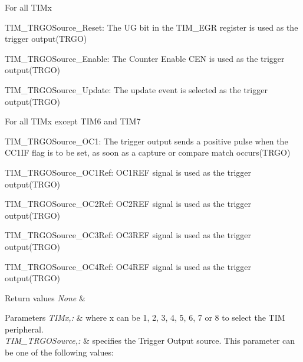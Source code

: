 \begin{DoxyItemize}
\item For all T\-I\-Mx \begin{DoxyItemize}
\item T\-I\-M\-\_\-\-T\-R\-G\-O\-Source\-\_\-\-Reset\-: The U\-G bit in the T\-I\-M\-\_\-\-E\-G\-R register is used as the trigger output(\-T\-R\-G\-O) \item T\-I\-M\-\_\-\-T\-R\-G\-O\-Source\-\_\-\-Enable\-: The Counter Enable C\-E\-N is used as the trigger output(\-T\-R\-G\-O) \item T\-I\-M\-\_\-\-T\-R\-G\-O\-Source\-\_\-\-Update\-: The update event is selected as the trigger output(\-T\-R\-G\-O)\end{DoxyItemize}

\item For all T\-I\-Mx except T\-I\-M6 and T\-I\-M7 \begin{DoxyItemize}
\item T\-I\-M\-\_\-\-T\-R\-G\-O\-Source\-\_\-\-O\-C1\-: The trigger output sends a positive pulse when the C\-C1\-I\-F flag is to be set, as soon as a capture or compare match occurs(\-T\-R\-G\-O) \item T\-I\-M\-\_\-\-T\-R\-G\-O\-Source\-\_\-\-O\-C1\-Ref\-: O\-C1\-R\-E\-F signal is used as the trigger output(\-T\-R\-G\-O) \item T\-I\-M\-\_\-\-T\-R\-G\-O\-Source\-\_\-\-O\-C2\-Ref\-: O\-C2\-R\-E\-F signal is used as the trigger output(\-T\-R\-G\-O) \item T\-I\-M\-\_\-\-T\-R\-G\-O\-Source\-\_\-\-O\-C3\-Ref\-: O\-C3\-R\-E\-F signal is used as the trigger output(\-T\-R\-G\-O) \item T\-I\-M\-\_\-\-T\-R\-G\-O\-Source\-\_\-\-O\-C4\-Ref\-: O\-C4\-R\-E\-F signal is used as the trigger output(\-T\-R\-G\-O)\end{DoxyItemize}

\begin{DoxyRetVals}{Return values}
{\em None} & \\
\hline
\end{DoxyRetVals}

\begin{DoxyParams}{Parameters}
{\em T\-I\-Mx,\-:} & where x can be 1, 2, 3, 4, 5, 6, 7 or 8 to select the T\-I\-M peripheral.\\
\hline
{\em T\-I\-M\-\_\-\-T\-R\-G\-O\-Source,\-:} & specifies the Trigger Output source. This parameter can be one of the following values\-:\\
\hline
\end{DoxyParams}


\end{DoxyItemize}

